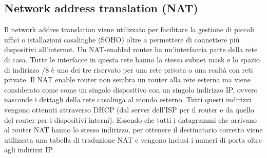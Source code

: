 \subsection{Network address translation (NAT)}
Il network addres translation viene utilizzato per facilitare la gestione di piccoli uffici o istallazioni casalinghe (SOHO) oltre a permettere di 
connettere pi\`u dispositivi all'internet. Un NAT-enabled router ha un'interfaccia parte della rete di casa. Tutte le interfacce in questa rete hanno la 
stessa subnet mask e lo spazio di indirizzo $/8$ \`e uno dei tre riservato per una rete privata o una realt\`a con reti private. Il NAT enable router non
sembra un router alla rete esterna ma viene considerato come come un singolo dispositivo con un singolo indirizzo IP, ovvero nasconde i dettagli della rete
casalinga al mondo esterno. Tutti questi indirizzi vengono ottenuti attraverso DHCP (dal server dell'ISP per il router e da quello del router per i 
dispositivi interni). Essendo che tutti i datagrammi che arrivano al router NAT hanno lo stesso indirizzo, per ottenere il destinatario corretto viene 
utilizzata una tabella di traduzione NAT e vengono inclusi i numeri di porta oltre agli indirizzi IP.
